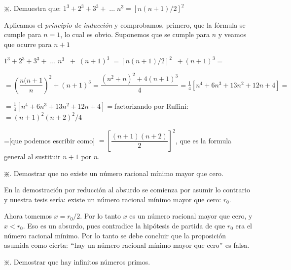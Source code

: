 		
		
		\begin{ejre} $\divideontimes$.
			Demuestra que: $1^3+2^3+3^3+\; ...\; n^3= [n(n+1)/2]^2$
		\end{ejre}
		
		\begin{proofw}\renewcommand{\qedsymbol}{$\diamond$}
		
			Aplicamos el \emph{principio de inducción} y comprobamos, primero, que la fórmula se cumple para $n=1$, lo cual es obvio. Suponemos que se cumple para $n$ y veamos que ocurre para $n+1$
			
				 $1^3+2^3+3^3+\; ...\; n^3 \; \; +\; (n+1)^3\; =  [n(n+1)/2]^2 \; \; +(n+1)^3=$
				
				 $=  \left( \dfrac {n(n+1}{n} \right)^2 + (n+1)^3=\dfrac {(n^2+n)^2+4(n+1)^3}{4}= \frac 1 4 [n^4+6n^3+13n^2+12n+4]=$
				
				  $=\frac 1 4 [n^4+6n^3+13n^2+12n+4]=$factorizando por Ruffini: $=(n+1)^2(n+2)^2/4$
				
				=[que podemos escribir como] $=\left[ \dfrac {(n+1)(n+2)}{2} \right]^2$, que es la formula general al sustituir $n+1$ por $n$.
		\end{proofw}
		
		\begin{ejre} $\divideontimes$.
			Demostrar que no existe un número racional mínimo mayor que cero.
		\end{ejre}
		
		\begin{proofw}\renewcommand{\qedsymbol}{$\diamond$}
		
		En la demostración por reducción al absurdo se comienza por asumir lo contrario y nuestra tesis sería: existe un número racional mínimo mayor que cero: $r_0$.

		Ahora tomemos $x = r_0/2$. Por lo tanto $x$ es un número racional mayor que cero, y $x<r_0$. Eso es un absurdo, pues contradice la hipótesis de partida de que $r_0$ era el número racional mínimo. Por lo tanto se debe concluir que la proposición asumida como cierta: $``$hay un número racional mínimo mayor que cero$"$ es falsa.
		\end{proofw}
		
		\begin{ejre} $\divideontimes$.
			Demostrar que hay infinitos números primos.
		\end{ejre}
		

